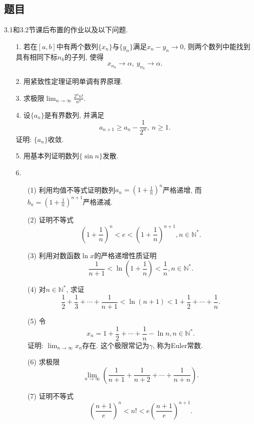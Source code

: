 \documentclass[UTF8,11pt, a4paper, oneside, fontset=none]{ctexbook}
\begin{document}
\subsection*{题目}

3.1和3.2节课后布置的作业以及以下问题.

\begin{itemize}

\item[1.] 若在$[a, b]$中有两个数列$\{ x_n \}$与$\{ y_n \}$满足$x_n - y_n \to 0$, 则两个数列中能找到具有相同下标$n_k$的子列, 使得
\[
x_{n_k} \to \alpha, \ y_{n_k} \to \alpha.
\]

\item[2.] 用紧致性定理证明单调有界原理.

\item[3.] 求极限$\lim_{n \to \infty} \frac{2^n n!}{n^n}$.

\item[4.] 设$\{a_n\}$是有界数列, 并满足
\[
a_{n+1} \geq a_n - \frac{1}{2^n}, \ n \geq 1.
\]
证明: $\{a_n\}$收敛.

\item[5.] 用基本列证明数列$\{ \sin n \}$发散.

\item[6.]
\begin{itemize}
\item[(1)] 利用均值不等式证明数列$a_n = \left( 1 + \frac{1}{n}\right)^n$严格递增, 而$b_n = \left( 1 + \frac{1}{n}\right)^{n+1}$严格递减.
\item[(2)] 证明不等式
\[
\left( 1 + \frac{1}{n}\right)^n < e < \left( 1 + \frac{1}{n}\right)^{n+1}, n \in \mathbb N^*.
\]
\item[(3)] 利用对数函数$\ln x$的严格递增性质证明
\[
\frac{1}{n+1} < \ln(1 + \frac{1}{n}) < \frac{1}{n}, n \in \mathbb N^*.
\]
\item[(4)] 对$n \in \mathbb N^*$, 求证
\[
\frac{1}{2} + \frac{1}{3} + \cdots + \frac{1}{n+1} < \ln(n+1) < 1 + \frac{1}{2} + \cdots + \frac{1}{n}.
\]
\item[(5)] 令
\[
x_n = 1 + \frac{1}{2} + \cdots +\frac{1}{n} - \ln n, n \in \mathbb N^*.
\]
证明: $\lim_{n \to \infty} x_n$存在. 这个极限常记为$\gamma$, 称为Euler常数.
\item[(6)] 求极限
\[
\lim_{n \to \infty} \left( \frac{1}{n+1} + \frac{1}{n+2} + \cdots + \frac{1}{n+n}\right).
\]
\item[(7)] 证明不等式
\[
\left( \frac{n+1}{e} \right)^n < n! < e \left( \frac{n+1}{e} \right)^{n+1}.
\]
\end{itemize}

\end{itemize}
\end{document}
